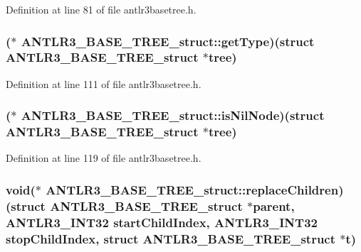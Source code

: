 Definition at line 81 of file antlr3basetree.\-h.

\hypertarget{struct_a_n_t_l_r3___b_a_s_e___t_r_e_e__struct_a9782f2448491bcc3ba230ff988048631}{
\subsubsection[{get\-Type}]{($\ast$ A\-N\-T\-L\-R3\-\_\-\-B\-A\-S\-E\-\_\-\-T\-R\-E\-E\-\_\-struct\-::get\-Type)(struct {\bf A\-N\-T\-L\-R3\-\_\-\-B\-A\-S\-E\-\_\-\-T\-R\-E\-E\-\_\-struct} $\ast$tree)}}\label{struct_a_n_t_l_r3___b_a_s_e___t_r_e_e__struct_a9782f2448491bcc3ba230ff988048631}


Definition at line 111 of file antlr3basetree.\-h.

\hypertarget{struct_a_n_t_l_r3___b_a_s_e___t_r_e_e__struct_a168ab0a690e209efbdc911ca0e1d6c19}{
\subsubsection[{is\-Nil\-Node}]{($\ast$ A\-N\-T\-L\-R3\-\_\-\-B\-A\-S\-E\-\_\-\-T\-R\-E\-E\-\_\-struct\-::is\-Nil\-Node)(struct {\bf A\-N\-T\-L\-R3\-\_\-\-B\-A\-S\-E\-\_\-\-T\-R\-E\-E\-\_\-struct} $\ast$tree)}}\label{struct_a_n_t_l_r3___b_a_s_e___t_r_e_e__struct_a168ab0a690e209efbdc911ca0e1d6c19}


Definition at line 119 of file antlr3basetree.\-h.

\hypertarget{struct_a_n_t_l_r3___b_a_s_e___t_r_e_e__struct_a48bb3beff9c05579de1959f276a8c2c1}{
\subsubsection[{replace\-Children}]{\setlength{\rightskip}{0pt plus 5cm}void($\ast$ A\-N\-T\-L\-R3\-\_\-\-B\-A\-S\-E\-\_\-\-T\-R\-E\-E\-\_\-struct\-::replace\-Children)(struct {\bf A\-N\-T\-L\-R3\-\_\-\-B\-A\-S\-E\-\_\-\-T\-R\-E\-E\-\_\-struct} $\ast$parent, {\bf A\-N\-T\-L\-R3\-\_\-\-I\-N\-T32} start\-Child\-Index, {\bf A\-N\-T\-L\-R3\-\_\-\-I\-N\-T32} stop\-Child\-Index, struct {\bf A\-N\-T\-L\-R3\-\_\-\-B\-A\-S\-E\-\_\-\-T\-R\-E\-E\-\_\-struct} $\ast${\bf t})}}\label{struct_a_n_t_l_r3___b_a_s_e___t_r_e_e__struct_a48bb3beff9c05579de1959f276a8c2c1}


